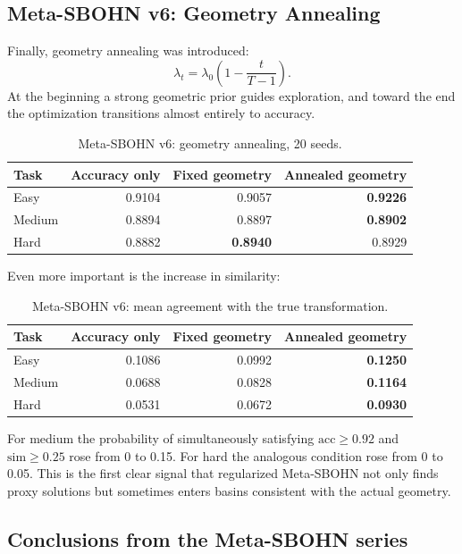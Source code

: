 \documentclass[11pt,a4paper]{report}
\begin{document}
\subsection{Meta-SBOHN v6: Geometry Annealing}

Finally, geometry annealing was introduced:
\[
  \lambda_t = \lambda_0\left(1-\frac{t}{T-1}\right).
\]
At the beginning a strong geometric prior guides exploration, and toward the end the
optimization transitions almost entirely to accuracy.

\begin{table}[h]
\centering
\caption{Meta-SBOHN v6: geometry annealing, 20 seeds.}
\begin{tabular}{l r r r}
\hline
Task & Accuracy only & Fixed geometry & Annealed geometry \\
\hline
Easy & 0.9104 & 0.9057 & \textbf{0.9226} \\
Medium & 0.8894 & 0.8897 & \textbf{0.8902} \\
Hard & 0.8882 & \textbf{0.8940} & 0.8929 \\
\hline
\end{tabular}
\end{table}

Even more important is the increase in similarity:
\begin{table}[h]
\centering
\caption{Meta-SBOHN v6: mean agreement with the true transformation.}
\begin{tabular}{l r r r}
\hline
Task & Accuracy only & Fixed geometry & Annealed geometry \\
\hline
Easy & 0.1086 & 0.0992 & \textbf{0.1250} \\
Medium & 0.0688 & 0.0828 & \textbf{0.1164} \\
Hard & 0.0531 & 0.0672 & \textbf{0.0930} \\
\hline
\end{tabular}
\end{table}

For medium the probability of simultaneously satisfying
\(\mathrm{acc}\ge 0.92\) and \(\mathrm{sim}\ge 0.25\) rose from 0 to 0.15.
For hard the analogous condition rose from 0 to 0.05. This is the first clear signal that
regularized Meta-SBOHN not only finds proxy solutions but sometimes enters
basins consistent with the actual geometry.

\subsection{Conclusions from the Meta-SBOHN series}
\end{document}

